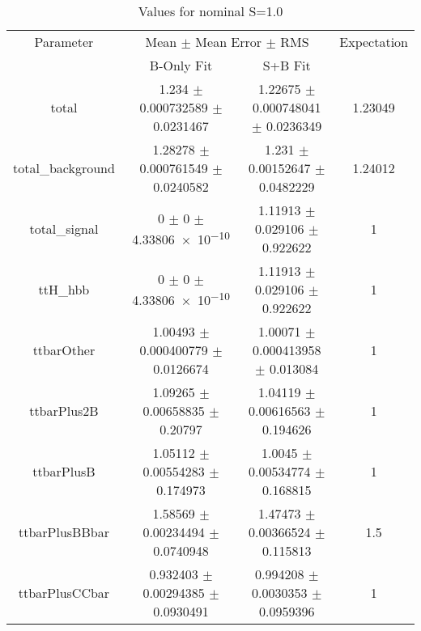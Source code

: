 \begin{table}
\centering
\caption{Values for nominal S=1.0}
\begin{tabular}{cccc}
\toprule
Parameter & \multicolumn{2}{c}{Mean $\pm$ Mean Error $\pm$ RMS} & Expectation\\
 & B-Only Fit & S+B Fit & \\
\midrule
total & \num{1.234} $\pm$ \num{0.000732589} $\pm$ \num{0.0231467} & \num{1.22675} $\pm$ \num{0.000748041} $\pm$ \num{0.0236349} & \num{1.23049}\\
total\_background & \num{1.28278} $\pm$ \num{0.000761549} $\pm$ \num{0.0240582} & \num{1.231} $\pm$ \num{0.00152647} $\pm$ \num{0.0482229} & \num{1.24012}\\
total\_signal & \num{0} $\pm$ \num{0} $\pm$ \num{4.33806e-10} & \num{1.11913} $\pm$ \num{0.029106} $\pm$ \num{0.922622} & \num{1}\\
ttH\_hbb & \num{0} $\pm$ \num{0} $\pm$ \num{4.33806e-10} & \num{1.11913} $\pm$ \num{0.029106} $\pm$ \num{0.922622} & \num{1}\\
ttbarOther & \num{1.00493} $\pm$ \num{0.000400779} $\pm$ \num{0.0126674} & \num{1.00071} $\pm$ \num{0.000413958} $\pm$ \num{0.013084} & \num{1}\\
ttbarPlus2B & \num{1.09265} $\pm$ \num{0.00658835} $\pm$ \num{0.20797} & \num{1.04119} $\pm$ \num{0.00616563} $\pm$ \num{0.194626} & \num{1}\\
ttbarPlusB & \num{1.05112} $\pm$ \num{0.00554283} $\pm$ \num{0.174973} & \num{1.0045} $\pm$ \num{0.00534774} $\pm$ \num{0.168815} & \num{1}\\
ttbarPlusBBbar & \num{1.58569} $\pm$ \num{0.00234494} $\pm$ \num{0.0740948} & \num{1.47473} $\pm$ \num{0.00366524} $\pm$ \num{0.115813} & \num{1.5}\\
ttbarPlusCCbar & \num{0.932403} $\pm$ \num{0.00294385} $\pm$ \num{0.0930491} & \num{0.994208} $\pm$ \num{0.0030353} $\pm$ \num{0.0959396} & \num{1}\\
\bottomrule
\end{tabular}
\end{table}